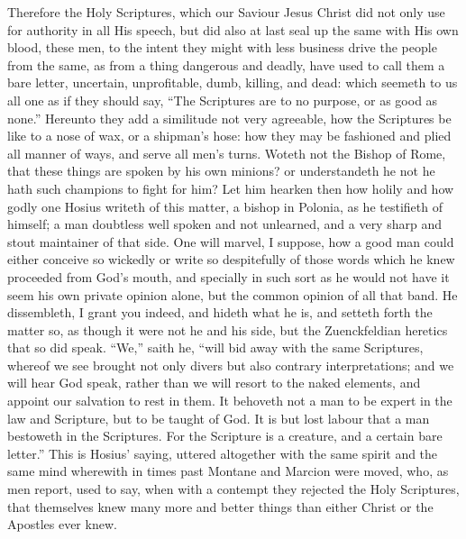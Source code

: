 Therefore the Holy Scriptures, which our Saviour Jesus Christ did
not only use for authority in all His speech, but did also at last seal
up the same with His own blood, these men, to the intent they might
with less business drive the people from the same, as from a thing dangerous
and deadly, have used to call them a bare letter, uncertain, unprofitable,
dumb, killing, and dead: which seemeth to us all one as if they should
say, “The Scriptures are to no purpose, or as good as none.”
Hereunto they add a similitude not very agreeable, how the Scriptures
be like to a nose of wax, or a shipman’s hose: how they may be
fashioned and plied all manner of ways, and serve all men’s turns.
Woteth not the Bishop of Rome, that these things are spoken by his own
minions? or understandeth he not he hath such champions to fight for
him? Let him hearken then how holily and how godly one Hosius
writeth of this matter, a bishop in Polonia, as he testifieth of himself;
a man doubtless well spoken and not unlearned, and a very sharp and
stout maintainer of that side. One will marvel, I suppose, how
a good man could either conceive so wickedly or write so despitefully
of those words which he knew proceeded from God’s mouth, and specially
in such sort as he would not have it seem his own private opinion alone,
but the common opinion of all that band. He dissembleth, I grant
you indeed, and hideth what he is, and setteth forth the matter so,
as though it were not he and his side, but the Zuenckfeldian heretics
that so did speak. “We,” saith he, “will bid
away with the same Scriptures, whereof we see brought not only divers
but also contrary interpretations; and we will hear God speak, rather
than we will resort to the naked elements, and appoint our salvation
to rest in them. It behoveth not a man to be expert in the law
and Scripture, but to be taught of God. It is but lost labour
that a man bestoweth in the Scriptures. For the Scripture is a
creature, and a certain bare letter.” This is Hosius’
saying, uttered altogether with the same spirit and the same mind wherewith
in times past Montane and Marcion were moved, who, as men report, used
to say, when with a contempt they rejected the Holy Scriptures, that
themselves knew many more and better things than either Christ or the
Apostles ever knew.

